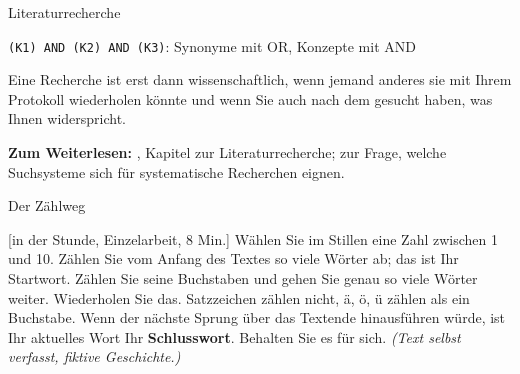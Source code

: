\begin{handout}{Literaturrecherche}
\begin{center}
\smallskip
\texttt{(K1) AND (K2) AND (K3)}: Synonyme mit OR, Konzepte mit AND
\end{center}

\begin{merkbox}
Eine Recherche ist erst dann wissenschaftlich, wenn jemand anderes sie mit
Ihrem Protokoll wiederholen könnte und wenn Sie auch nach dem gesucht haben,
was Ihnen widerspricht.
\end{merkbox}

\textbf{Zum Weiterlesen:} \textcite{doering2016forschungsmethoden}, Kapitel
zur Literaturrecherche; \textcite{gusenbauer2020academic} zur Frage, welche
Suchsysteme sich für systematische Recherchen eignen.
\end{handout}

\begin{uebungsblatt}{Der Zählweg}

[in der Stunde, Einzelarbeit, 8 Min.]
Wählen Sie im Stillen eine Zahl zwischen 1 und 10. Zählen Sie vom Anfang des
Textes so viele Wörter ab; das ist Ihr Startwort. Zählen Sie seine Buchstaben
und gehen Sie genau so viele Wörter weiter. Wiederholen Sie das. Satzzeichen
zählen nicht, ä, ö, ü zählen als ein Buchstabe. Wenn der nächste Sprung über
das Textende hinausführen würde, ist Ihr aktuelles Wort Ihr
\textbf{Schlusswort}. Behalten Sie es für sich. \emph{(Text selbst verfasst,
fiktive Geschichte.)}


\end{uebungsblatt}

